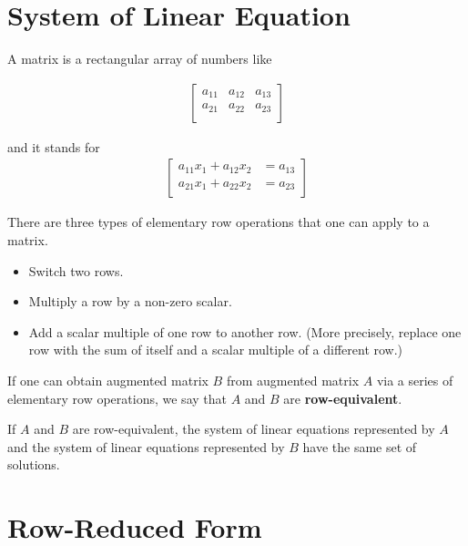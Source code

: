 \documentclass{package/notes}
\begin{document}
\section{System of Linear Equation}

A matrix is a rectangular array of numbers like 

\begin{align*}       
\left[               
  \begin{array}{ccc}   
    a_{11} & a_{12} & a_{13}\\  
    a_{21} & a_{22} & a_{23}\\  
  \end{array}
\right]               
\end{align*}

and it stands for 
\begin{align*}      
\left[                
  \begin{array}{ccc}  
    a_{11}x_1+a_{12}x_2 & =a_{13}\\  
    a_{21}x_1 +a_{22}x_2 & =a_{23}\\  
  \end{array}
\right]                
\end{align*}

There are three types of elementary row operations that one can apply to a matrix.

\begin{itemize}
    \item Switch two rows.
    \item Multiply a row by a non-zero scalar.
    \item Add a scalar multiple of one row to another row. (More precisely, replace one row with the sum of itself and a scalar multiple of a different row.)
\end{itemize}


\begin{definition}

If one can obtain augmented matrix $B$ from augmented matrix $A$  via a series of elementary row operations, we say that $A$ and $B$ are \textbf{row-equivalent}.
\end{definition}


If $A$ and $B$ are row-equivalent, the system of linear equations represented by $A$ and the system of linear equations represented by $B$ have the same set of solutions.

\section{Row-Reduced Form}
\end{document}
